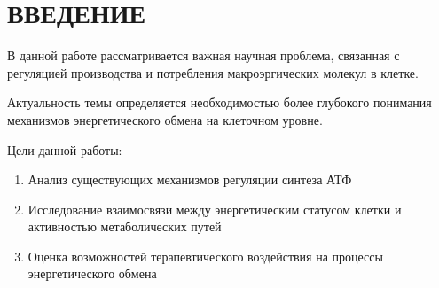 \section{ВВЕДЕНИЕ}

В данной работе рассматривается важная научная проблема, связанная с регуляцией производства и потребления макроэргических молекул в клетке.

Актуальность темы определяется необходимостью более глубокого понимания механизмов энергетического обмена на клеточном уровне.

Цели данной работы:
\begin{enumerate}
    \item Анализ существующих механизмов регуляции синтеза АТФ
    \item Исследование взаимосвязи между энергетическим статусом клетки и активностью метаболических путей
    \item Оценка возможностей терапевтического воздействия на процессы энергетического обмена
\end{enumerate}

